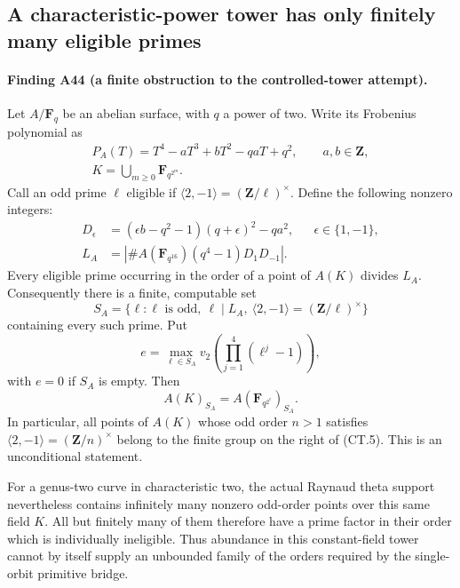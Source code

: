 \subsection{A characteristic-power tower has only finitely many eligible primes}
\label{sec:pro-two-tower-obstruction}

\paragraph{Finding A44 (a finite obstruction to the controlled-tower attempt).}
Let $A/\mathbf F_q$ be an abelian surface, with $q$ a power of two.
Write its Frobenius polynomial as
\[
 \begin{gathered}
 P_A(T)=T^4-aT^3+bT^2-qaT+q^2,\qquad a,b\in\mathbf Z,\\
 K=\bigcup_{m\ge0}\mathbf F_{q^{2^m}}.
 \end{gathered}
 \tag{CT.1}
\]
Call an odd prime $\ell$ eligible if
$\langle2,-1\rangle=(\mathbf Z/\ell)^\times$.
Define the following nonzero integers:
\[
 \begin{aligned}
 D_\epsilon&=(\epsilon b-q^2-1)(q+\epsilon)^2-qa^2,
                         &&\epsilon\in\{1,-1\},\\
 L_A&=\left|\#A(\mathbf F_{q^{16}})
                    (q^4-1)D_1D_{-1}\right|.
 \end{aligned}
 \tag{CT.2}
\]
Every eligible prime occurring in the order of a point of $A(K)$
divides $L_A$. Consequently there is a finite, computable set
\[
 S_A=\{\ell:\ell\text{ is odd},\ \ell\mid L_A,\
                 \langle2,-1\rangle=(\mathbf Z/\ell)^\times\}
 \tag{CT.3}
\]
containing every such prime. Put
\[
 e=\max_{\ell\in S_A}v_2\!\left(
                   \prod_{j=1}^{4}(\ell^j-1)\right),
 \tag{CT.4}
\]
with $e=0$ if $S_A$ is empty. Then
\[
          A(K)_{S_A}=A(\mathbf F_{q^{2^e}})_{S_A}.
 \tag{CT.5}
\]
In particular, all points of $A(K)$ whose odd order $n>1$ satisfies
$\langle2,-1\rangle=(\mathbf Z/n)^\times$ belong to the finite
group on the right of (CT.5). This is an unconditional statement.

For a genus-two curve in characteristic two, the actual Raynaud
theta support nevertheless contains infinitely many nonzero
odd-order points over this same field $K$. All but finitely many
of them therefore have a prime factor in their order which is
individually ineligible. Thus abundance in this constant-field
tower cannot by itself supply an unbounded family of the orders
required by the single-orbit primitive bridge.


